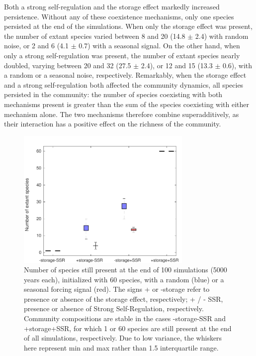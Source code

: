 \documentclass[a4paper,12pt]{article}
\begin{document}
Both a strong self-regulation and the storage effect markedly increased
persistence. Without any of these coexistence mechanisms, only one
species persisted at the end of the simulations. When only the storage
effect was present, the number of extant species varied between 8
and 20 (14.8 $\pm$ 2.4) with random noise, or 2 and 6 (4.1 $\pm$
0.7) with a seasonal signal. On the other hand, when only a strong
self-regulation was present, the number of extant species nearly doubled,
varying between 20 and 32 (27.5 $\pm$ 2.4), or 12 and 15 (13.3 $\pm$
0.6), with a random or a seasonal noise, respectively. Remarkably,
when the storage effect and a strong self-regulation both affected
the community dynamics, all species persisted in the community: the
number of species coexisting with both mechanisms present is greater
than the sum of the species coexisting with either mechanism alone.
The two mechanisms therefore combine superadditively, as their interaction
has a positive effect on the richness of the community.

\begin{figure}[!ht]
\begin{centering}
\includegraphics[width=0.75\textwidth]{Fig2-eps-converted-to.pdf}
\par\end{centering}
\caption{Number of species still present at the end of 100 simulations (5000
years each), initialized with 60 species, with a random (blue) or
a seasonal forcing signal (red). The signs + or -storage refer to
presence or absence of the storage effect, respectively; + / - SSR,
presence or absence of Strong Self-Regulation, respectively. Community
compositions are stable in the cases -storage-SSR and +storage+SSR,
for which 1 or 60 species are still present at the end of all simulations,
respectively. Due to low variance, the whiskers here represent min
and max rather than 1.5 interquartile range. \label{fig:Persistence-of-species}}
\end{figure}
\end{document}
